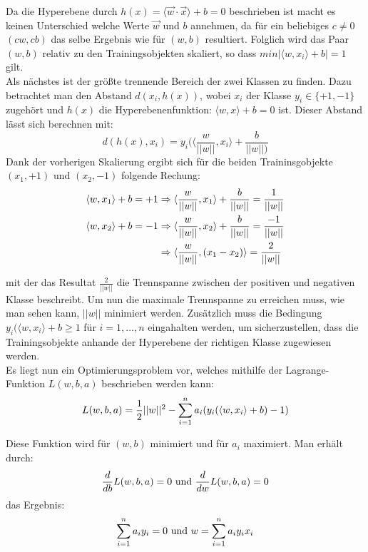 Da die Hyperebene durch $h(x)=\langle\vec{w}\cdot\vec{x}\rangle+b=0$ beschrieben ist macht es keinen Unterschied welche Werte $\vec{w}$ und $b$ annehmen, da für ein beliebiges $c\neq 0$ $(cw,cb)$ das selbe Ergebnis wie für $(w,b)$ resultiert. Folglich wird das Paar $(w,b)$ relativ zu den Trainingsobjekten skaliert, so dass $min\lvert\langle w,x_i \rangle +b\rvert=1$ gilt.\\
Als nächstes ist der größte trennende Bereich der zwei Klassen zu finden. Dazu betrachtet man den Abstand $d(x_i,h(x))$, wobei $x_i$ der Klasse $y_i\in\{+1,-1\}$ zugehört und $h(x)$ die Hyperebenenfunktion: $\langle w,x \rangle+b=0$ ist. Dieser Abstand lässt sich berechnen mit:
$$ d(h(x),x_i)=y_i(\langle\frac{w}{\lvert\lvert w \rvert\rvert},x_i\rangle + \frac{b}{\lvert\lvert w \rvert\rvert)}$$
Dank der vorherigen Skalierung ergibt sich für die beiden Traininsgobjekte $(x_1,+1)$ und $(x_2,-1)$ folgende Rechung:
\begin{align*}
    \langle w,x_1 \rangle+b=+1
    & \Rightarrow%
    \langle \frac{w}{\lvert\lvert w \rvert\rvert},x_1\rangle+\frac{b}{\lvert\lvert w \rvert\rvert}=\frac{1}{\lvert\lvert w \rvert\rvert}\notag\\
    \langle w,x_2 \rangle+b=-1
    & \Rightarrow%
    \langle \frac{w}{\lvert\lvert w \rvert\rvert},x_2\rangle+\frac{b}{\lvert\lvert w \rvert\rvert}=\frac{-1}{\lvert\lvert w \rvert\rvert}\notag\\
    & \Rightarrow \langle \frac{w}{\lvert\lvert w \rvert\rvert},(x_1-x_2)\rangle=\frac{2}{\lvert\lvert w \rvert\rvert}\notag
\end{align*}

mit der das Resultat $\frac{2}{\lvert\lvert w \rvert\rvert}$ die Trennspanne zwischen der positiven und negativen Klasse beschreibt. Um nun die maximale Trennspanne zu erreichen muss, wie man sehen kann, $\lvert\lvert w \rvert\rvert$ minimiert werden. Zusätzlich muss die Bedingung $y_i(\langle w,x_i \rangle + b \geq 1$ für $i=1,\dots,n$ eingahalten werden, um sicherzustellen, dass die Trainingsobjekte anhande der Hyperebene der richtigen Klasse zugewiesen werden.\\
Es liegt nun ein Optimierungsproblem vor, welches mithilfe der Lagrange-Funktion $L(w,b,a)$ beschrieben werden kann:
\begin{align}
L(w,b,a) = \frac{1}{2}\lvert\lvert w \rvert\rvert^2-\sum\limits_{i=1}^n a_i(y_i(\langle w,x_i \rangle + b)-1)\notag
\end{align}

Diese Funktion wird für $(w,b)$ minimiert und für $a_i$ maximiert. Man erhält durch:
\begin{align}
\frac{d}{db}L(w,b,a)=0 \text{ und } \frac{d}{dw}L(w,b,a)=0\notag
\end{align}
das Ergebnis:
\begin{align}
\sum\limits_{i=1}^n a_i y_i=0\text{ und } w=\sum\limits_{i=1}^n a_i y_i x_i\notag
\end{align}


